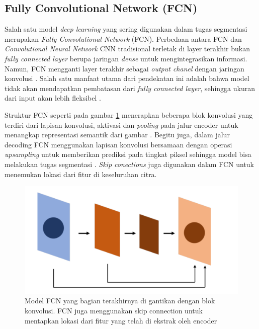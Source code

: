 \subsection{Fully Convolutional Network (FCN)}

Salah satu model \textit{deep learning} yang sering digunakan dalam tugas segmentasi merupakan \textit{Fully Convolutional Network }(FCN). Perbedaan antara FCN dan \textit{Convolutional Neural Network }CNN tradisional terletak di layer terakhir bukan \textit{fully connected layer} berupa jaringan \textit{dense} untuk mengintegrasikan informasi. Namun, FCN mengganti layer terakhir sebagai \textit{output chanel} dengan jaringan konvolusi \cite{shlezinger_model-based_2023,huang_fully_2022}. Salah satu manfaat utama dari pendekatan ini adalah bahwa model tidak akan mendapatkan pembatasan dari \textit{fully connected layer}, sehingga ukuran dari input akan lebih fleksibel \cite{iqbal_analyses_2023}.


Struktur FCN seperti pada gambar \ref{fig:fcn} menerapkan beberapa blok konvolusi yang terdiri dari lapisan konvolusi, aktivasi dan \textit{pooling} pada jalur encoder untuk menangkap representasi semantik dari gambar \cite{azad_medical_2022}. Begitu juga, dalam jalur decoding FCN menggunakan lapisan konvolusi bersamaan dengan operasi \textit{upsampling} untuk memberikan prediksi pada tingkat piksel sehingga model bisa melakukan tugas segmentasi \cite{deng_fcn_2023}. \textit{Skip conections} juga digunakan dalam FCN untuk menemukan lokasi dari fitur di keseluruhan citra. 

\begin{figure}[H]
	\centering
	\includegraphics[scale=.2]{gambar/gambar-fcn.png}
	\caption{Model FCN yang bagian terakhirnya di gantikan dengan blok konvolusi. FCN juga menggunakan skip connection untuk mentapkan lokasi dari fitur yang telah di ekstrak oleh encoder}
	\label{fig:fcn}
\end{figure}



